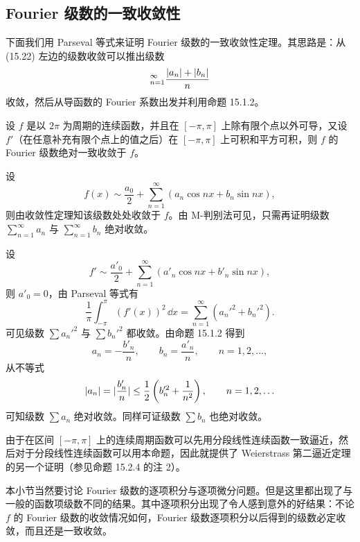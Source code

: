 \subsection{Fourier 级数的一致收敛性}

下面我们用 Parseval 等式来证明 Fourier 级数的一致收敛性定理。其思路是：从 (15.22) 左边的级数收敛可以推出级数
\[
  \relax_{n=1}^{\infty}\frac{\lvert a_n\rvert+\lvert b_n\rvert}{n}
\]
收敛，然后从导函数的 Fourier 系数出发并利用命题 15.1.2。

\begin{xproposition}[15.2.8]
设 $f$ 是以 $2\pi$ 为周期的连续函数，并且在 $[-\pi,\pi]$ 上除有限个点以外可导，又设 $f'$（在任意补充有限个点上的值之后）在 $[-\pi,\pi]$ 上可积和平方可积，则 $f$ 的 Fourier 级数绝对一致收敛于 $f$。
\end{xproposition}
\begin{xproof}
设
\[
  f(x)\sim\frac{a_0}{2}+\sum_{n=1}^{\infty}(a_n\cos nx+b_n\sin nx),
\]
则由收敛性定理知该级数处处收敛于 $f$。由 M-判别法可见，只需再证明级数 $\sum_{n=1}^{\infty}a_n$ 与 $\sum_{n=1}^{\infty}b_n$ 绝对收敛。

设
\[
  f'\sim\frac{a'_0}{2}+\sum_{n=1}^{\infty}(a'_n\cos nx+b'_n\sin nx),
\]
则 $a'_0=0$，由 Parseval 等式有
\[
  \frac1\pi\int_{-\pi}^{\pi}(f'(x))^2\,\dd x
  =\sum_{n=1}^{\infty}(a_n'^2+b_n'^2).
\]
可见级数 $\sum a_n'^2$ 与 $\sum b_n'^2$ 都收敛。由命题 15.1.2 得到
\[
  a_n=-\frac{b'_n}{n},\qquad b_n=\frac{a'_n}{n},\qquad n=1,2,\ldots,
\]
从不等式
\[
  \lvert a_n\rvert=\lvert\frac{b'_n}{n}\rvert\le\frac12\left(b_n'^2+\frac1{n^2}\right),\qquad n=1,2,\ldots
\]
可知级数 $\sum a_n$ 绝对收敛。同样可证级数 $\sum b_n$ 也绝对收敛。
\end{xproof}

\begin{xremark}
由于在区间 $[-\pi,\pi]$ 上的连续周期函数可以先用分段线性连续函数一致逼近，然后对于分段线性连续函数可以用本命题，因此就提供了 Weierstrass 第二逼近定理的另一个证明（参见命题 15.2.4 的注 2）。
\end{xremark}

本小节当然要讨论 Fourier 级数的逐项积分与逐项微分问题。但是这里都出现了与一般的函数项级数不同的结果。其中逐项积分出现了令人感到意外的好结果：不论 $f$ 的 Fourier 级数的收敛情况如何，Fourier 级数逐项积分以后得到的级数必定收敛，而且还是一致收敛。

